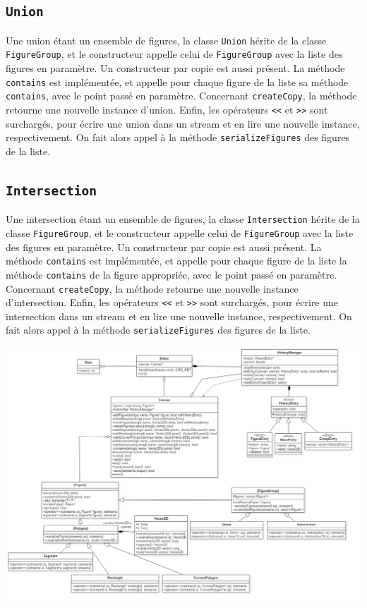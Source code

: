 \documentclass[11pt,a4paper]{article}
\begin{document}
	\subsection{\texttt{Union}}
	Une union étant un ensemble de figures, la classe \texttt{Union} hérite de la classe \texttt{FigureGroup}, et le constructeur appelle celui de \texttt{FigureGroup} avec la liste des figures en paramètre. Un constructeur par copie est aussi présent. La méthode \texttt{contains} est implémentée, et appelle pour chaque figure de la liste sa méthode \texttt{contains}, avec le point passé en paramètre. Concernant \texttt{createCopy}, la méthode retourne une nouvelle instance d'union. Enfin, les opérateurs \texttt{<<} et \texttt{>>} sont surchargés, pour écrire une union dans un stream et en lire une nouvelle instance, respectivement. On fait alors appel à la méthode \texttt{serializeFigures} des figures de la liste.
	
	\subsection{\texttt{Intersection}}
	Une intersection étant un ensemble de figures, la classe \texttt{Intersection} hérite de la classe \texttt{FigureGroup}, et le constructeur appelle celui de \texttt{FigureGroup} avec la liste des figures en paramètre. Un constructeur par copie est aussi présent. La méthode \texttt{contains} est implémentée, et appelle pour chaque figure de la liste la méthode \texttt{contains} de la figure appropriée, avec le point passé en paramètre. Concernant \texttt{createCopy}, la méthode retourne une nouvelle instance d'intersection. Enfin, les opérateurs \texttt{<<} et \texttt{>>} sont surchargés, pour écrire une intersection dans un stream et en lire une nouvelle instance, respectivement. On fait alors appel à la méthode \texttt{serializeFigures} des figures de la liste.
	
	\begin{landscape}
		\includegraphics[height=\textwidth]{ClassDiagram}
	\end{landscape}
	
\end{document}
